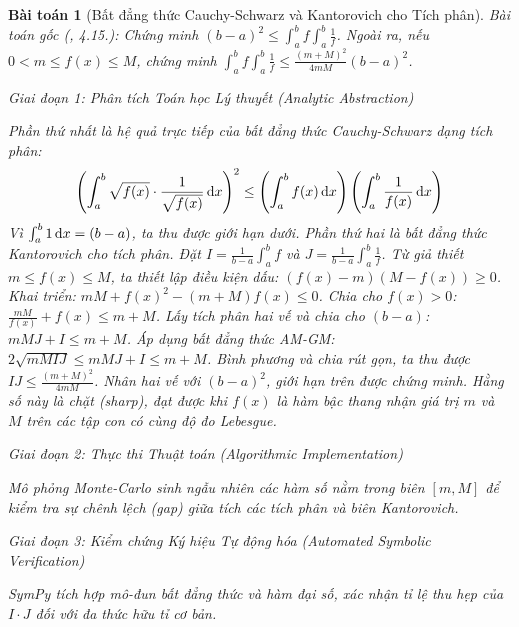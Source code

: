 \documentclass{article}
\newtheorem{baitoan}{Bài toán}
\begin{document}
\begin{baitoan}[Bất đẳng thức Cauchy-Schwarz và Kantorovich cho Tích phân]
 \emph{Bài toán gốc (\cite{Quoc_Long_Dat_Nam_VMC}, 4.15.):} 
 Chứng minh $(b-a)^2 \le \int_a^b f \int_a^b \frac{1}{f}$. Ngoài ra, nếu $0 < m \le f(x) \le M$, chứng minh $\int_a^b f \int_a^b \frac{1}{f} \le \frac{(m+M)^2}{4mM}(b-a)^2$.

\vspace{0.5em}\noindent\emph{Giai đoạn 1: Phân tích Toán học Lý thuyết (Analytic Abstraction)}
 
 Phần thứ nhất là hệ quả trực tiếp của bất đẳng thức Cauchy-Schwarz dạng tích phân:
 \begin{equation}
 \left( \int_a^b \sqrt{f(x)} \cdot \frac{1}{\sqrt{f(x)}} \,{\rm d}x \right)^2 \le \left( \int_a^b f(x)\,{\rm d}x \right) \left( \int_a^b \frac{1}{f(x)}\,{\rm d}x \right)
 \end{equation}
 Vì $\int_a^b 1 \,{\rm d}x = (b-a)$, ta thu được giới hạn dưới.
 Phần thứ hai là bất đẳng thức Kantorovich cho tích phân. Đặt $I = \frac{1}{b-a}\int_a^b f$ và $J = \frac{1}{b-a}\int_a^b \frac{1}{f}$.
 Từ giả thiết $m \le f(x) \le M$, ta thiết lập điều kiện dấu: $(f(x) - m)(M - f(x)) \ge 0$.
 Khai triển: $mM + f(x)^2 - (m+M)f(x) \le 0$. Chia cho $f(x) > 0$: $\frac{mM}{f(x)} + f(x) \le m+M$.
 Lấy tích phân hai vế và chia cho $(b-a)$: $mM J + I \le m+M$.
 Áp dụng bất đẳng thức AM-GM: $2\sqrt{mM I J} \le mM J + I \le m+M$.
 Bình phương và chia rút gọn, ta thu được $IJ \le \frac{(m+M)^2}{4mM}$. Nhân hai vế với $(b-a)^2$, giới hạn trên được chứng minh. Hằng số này là chặt (sharp), đạt được khi $f(x)$ là hàm bậc thang nhận giá trị $m$ và $M$ trên các tập con có cùng độ đo Lebesgue.

\vspace{0.5em}\noindent\emph{Giai đoạn 2: Thực thi Thuật toán (Algorithmic Implementation)}
 
 Mô phỏng Monte-Carlo sinh ngẫu nhiên các hàm số nằm trong biên $[m, M]$ để kiểm tra sự chênh lệch (gap) giữa tích các tích phân và biên Kantorovich.



\vspace{0.5em}\noindent\emph{Giai đoạn 3: Kiểm chứng Ký hiệu Tự động hóa (Automated Symbolic Verification)}
 
 \textsf{SymPy} tích hợp mô-đun bất đẳng thức và hàm đại số, xác nhận tỉ lệ thu hẹp của $I \cdot J$ đối với đa thức hữu tỉ cơ bản.


\end{baitoan}
\end{document}
